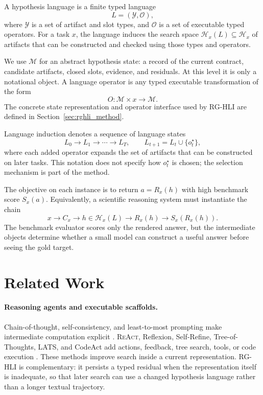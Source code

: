 \documentclass[letterpaper]{article}
\newcommand{\methodshort}{\textsc{RG-HLI}\xspace}
\newcommand{\react}{\textsc{ReAct}\xspace}
\newcommand{\codeact}{CodeAct\xspace}
\begin{document}
A hypothesis language is a finite typed language
\begin{equation}
  L=(\mathcal{Y},\mathcal{O}),
\end{equation}
where $\mathcal{Y}$ is a set of artifact and slot types, and $\mathcal{O}$ is a
set of executable typed operators. For a task $x$, the language induces the
search space $\mathcal{H}_x(L)\subseteq\mathcal{H}_x$ of artifacts that can be
constructed and checked using those types and operators.

We use $\mathcal{M}$ for an abstract hypothesis state: a record of the current
contract, candidate artifacts, closed slots, evidence, and residuals. At this
level it is only a notational object. A language operator is any typed
executable transformation of the form
\begin{equation}
  O:\mathcal{M}\times x \rightarrow \mathcal{M}.
\end{equation}
The concrete state representation and operator interface used by \methodshort
are defined in Section~\ref{sec:rghli_method}.

Language induction denotes a sequence of language states
\begin{equation}
  L_0\rightarrow L_1\rightarrow\cdots\rightarrow L_T,
  \qquad
  L_{t+1}=L_t\cup\{o_t^\star\},
\end{equation}
where each added operator expands the set of artifacts that can be constructed
on later tasks. This notation does not specify how $o_t^\star$ is chosen; the
selection mechanism is part of the method.

The objective on each instance is to return $a=R_x(h)$ with high benchmark
score $S_x(a)$. Equivalently, a scientific reasoning system must instantiate
the chain
\begin{equation}
  x \rightarrow C_x \rightarrow h\in\mathcal{H}_x(L)
  \rightarrow R_x(h) \rightarrow S_x(R_x(h)).
\end{equation}
The benchmark evaluator scores only the rendered answer, but the intermediate
objects determine whether a small model can construct a useful answer before
seeing the gold target.

\section{Related Work}

\paragraph{Reasoning agents and executable scaffolds.}
Chain-of-thought, self-consistency, and least-to-most prompting make
intermediate computation explicit
\citep{cot,selfconsistency,leasttomost,selfdiscover}.
\react, Reflexion, Self-Refine, Tree-of-Thoughts, LATS, and \codeact add actions,
feedback, tree search, tools, or code execution
\citep{react,reflexion,selfrefine,tot,lats,pal,pot,art,toolformer,critic,selfdebug,codeact}.
These methods improve search inside a current representation. \methodshort is
complementary: it persists a typed residual when the representation itself is
inadequate, so that later search can use a changed hypothesis language rather
than a longer textual trajectory.
\end{document}
